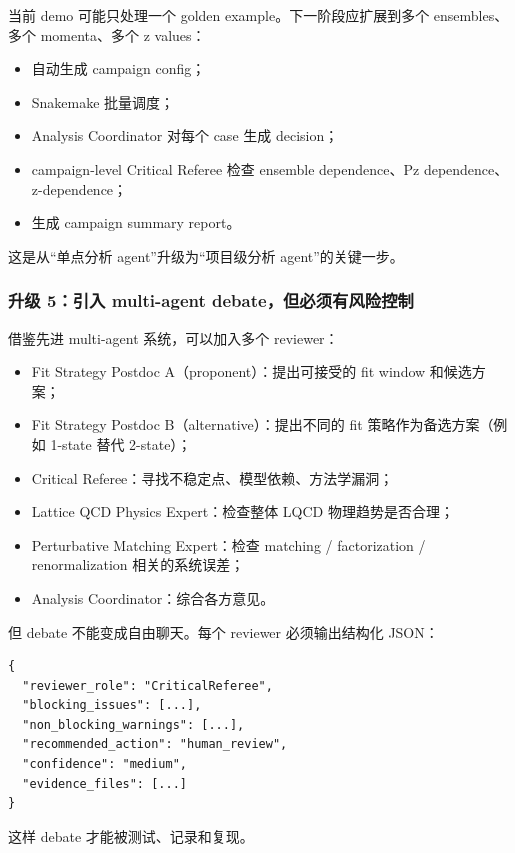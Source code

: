 \documentclass[11pt,a4paper,fontset=none]{ctexart}
\begin{document}
当前 demo 可能只处理一个 golden example。下一阶段应扩展到多个 ensembles、多个 momenta、多个 z values：

\begin{itemize}[leftmargin=2em]
  \item 自动生成 campaign config；
  \item Snakemake 批量调度；
  \item Analysis Coordinator 对每个 case 生成 decision；
  \item campaign-level Critical Referee 检查 ensemble dependence、Pz dependence、z-dependence；
  \item 生成 campaign summary report。
\end{itemize}

这是从“单点分析 agent”升级为“项目级分析 agent”的关键一步。

\subsubsection{升级 5：引入 multi-agent debate，但必须有风险控制}

借鉴先进 multi-agent 系统，可以加入多个 reviewer：

\begin{itemize}[leftmargin=2em]
  \item Fit Strategy Postdoc A（proponent）：提出可接受的 fit window 和候选方案；
  \item Fit Strategy Postdoc B（alternative）：提出不同的 fit 策略作为备选方案（例如 1-state 替代 2-state）；
  \item Critical Referee：寻找不稳定点、模型依赖、方法学漏洞；
  \item Lattice QCD Physics Expert：检查整体 LQCD 物理趋势是否合理；
  \item Perturbative Matching Expert：检查 matching / factorization / renormalization 相关的系统误差；
  \item Analysis Coordinator：综合各方意见。
\end{itemize}

但 debate 不能变成自由聊天。每个 reviewer 必须输出结构化 JSON：

\begin{lstlisting}
{
  "reviewer_role": "CriticalReferee",
  "blocking_issues": [...],
  "non_blocking_warnings": [...],
  "recommended_action": "human_review",
  "confidence": "medium",
  "evidence_files": [...]
}
\end{lstlisting}

这样 debate 才能被测试、记录和复现。
\end{document}
